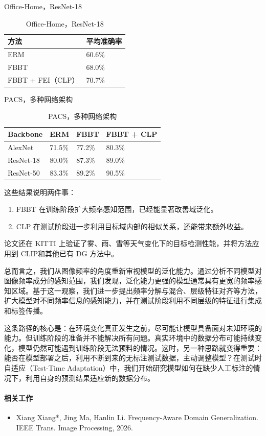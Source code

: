 Office-Home，ResNet-18

\begin{table}[H]\centering
\caption*{Office-Home，ResNet-18}
\begin{tabular}{ll}\toprule
\textbf{方法} & \textbf{平均准确率} \\ \midrule
ERM & 60.6\% \\
FBBT & 68.0\% \\
FBBT + FEI（CLP） & 70.7\% \\
\bottomrule\end{tabular}
\end{table}

PACS，多种网络架构

\begin{table}[H]\centering
\caption*{PACS，多种网络架构}
\begin{tabular}{llll}\toprule
\textbf{Backbone} & \textbf{ERM} & \textbf{FBBT} & \textbf{FBBT + CLP} \\ \midrule
AlexNet & 71.5\% & 77.2\% & 80.3\% \\
ResNet-18 & 80.0\% & 87.3\% & 89.0\% \\
ResNet-50 & 83.3\% & 89.2\% & 90.5\% \\
\bottomrule\end{tabular}
\end{table}

这些结果说明两件事：

\begin{enumerate}
  \item FBBT 在训练阶段扩大频率感知范围，已经能显著改善域泛化。
  \item CLP 在测试阶段进一步利用目标域内部的相似关系，还能带来额外收益。
\end{enumerate}

论文还在 KITTI 上验证了雾、雨、雪等天气变化下的目标检测性能，并将方法应用到 CLIP和其他已有 DG 方法中。

总而言之，我们从图像频率的角度重新审视模型的泛化能力。通过分析不同模型对图像频率成分的感知范围，我们发现，泛化能力更强的模型通常具有更宽的频率感知区域。基于这一观察，我们进一步提出频率分解与混合、层级特征对齐等方法，扩大模型对不同频率信息的感知能力，并在测试阶段利用不同层级的特征进行集成和标签传播。

这条路径的核心是：在环境变化真正发生之前，尽可能让模型具备面对未知环境的能力。但训练阶段的准备并不能解决所有问题。真实环境中的数据分布可能持续变化，模型仍然可能遇到训练阶段无法预料的情况。这时，另一种思路就变得重要：能否在模型部署之后，利用不断到来的无标注测试数据，主动调整模型？在测试时自适应（Test-Time Adaptation）中，我们开始研究模型如何在缺少人工标注的情况下，利用自身的预测结果适应新的数据分布。

\paragraph{相关工作}

\begin{itemize}
  \item Xiang Xiang*, Jing Ma, Hanlin Li. Frequency-Aware Domain Generalization. IEEE Trans. Image Processing, 2026.
\end{itemize}
